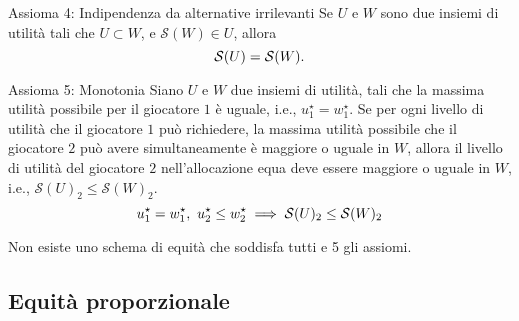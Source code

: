 \documentclass{beamer}
\begin{document}
\begin{frame}
	\begin{exampleblock}{Assioma 4: Indipendenza da alternative irrilevanti} \label{ax4}
		Se $U$ e $W$ sono due insiemi di utilità tali che $U \subset W$, e $\mathcal{S}(W) \in U$, allora
		\vspace{-0.2cm}
		\begin{equation}
			\mathcal{S}(U) = \mathcal{S}(W).
			\vspace{-0.2cm}
		\end{equation}
	\end{exampleblock}
	\begin{exampleblock}{Assioma 5: Monotonia} \label{ax5}
		Siano $U$ e $W$ due insiemi di utilità, tali che la massima utilità possibile per il giocatore $1$ è uguale, i.e., $u_1^\star = w_1^{\star}$. Se per ogni livello di utilità che il giocatore $1$ può richiedere, la massima utilità possibile che il giocatore $2$ può avere simultaneamente è maggiore o uguale in $W$, allora il livello di utilità del giocatore $2$ nell'allocazione equa deve essere maggiore o uguale in $W$, i.e., $\mathcal{S}(U)_2 \le \mathcal{S}(W)_2$.
		\vspace{-0.3cm}
		\begin{equation}
			u_1^\star = w_1^{\star}, \ u_2^\star \le w_2^{\star} \implies \mathcal{S}(U)_2 \le \mathcal{S}(W)_2
			\vspace{-0.3cm}
		\end{equation}

	\end{exampleblock}
\end{frame}

\begin{frame}
	\begin{exampleblock}{}
		Non esiste uno schema di equità che soddisfa tutti e 5 gli assiomi. 
	\end{exampleblock}
\end{frame}

\subsection{Equità proporzionale}
\end{document}

